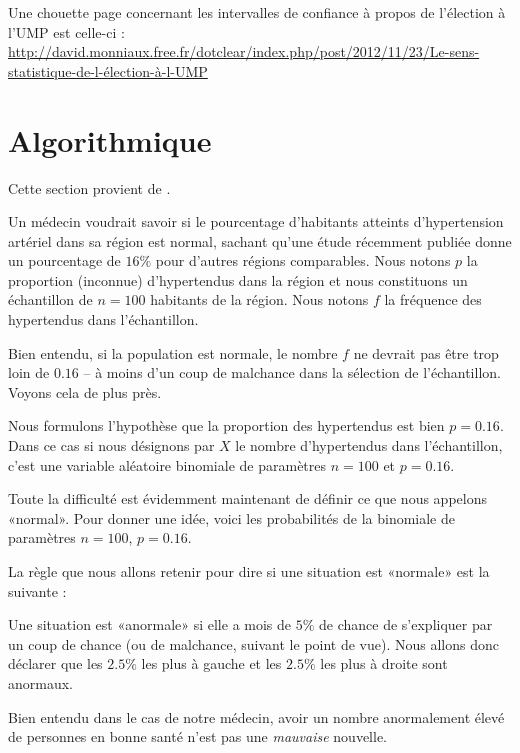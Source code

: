 Une chouette page concernant les intervalles de confiance à propos de l'élection à l'UMP est celle-ci :\\
\url{http://david.monniaux.free.fr/dotclear/index.php/post/2012/11/23/Le-sens-statistique-de-l-élection-à-l-UMP}

\section{Algorithmique}

Cette section provient de \cite{JqcbOc}.

Un médecin voudrait savoir si le pourcentage d'habitants atteints d'hypertension artériel dans sa région est normal, sachant qu'une étude récemment publiée donne un pourcentage de \( 16\%\) pour d'autres régions comparables. Nous notons \( p\) la proportion (inconnue) d'hypertendus dans la région et nous constituons un échantillon de \( n=100\) habitants de la région. Nous notons \( f\) la fréquence des hypertendus dans l'échantillon.

Bien entendu, si la population est normale, le nombre \( f\) ne devrait pas être trop loin de \( 0.16\) -- à moins d'un coup de malchance dans la sélection de l'échantillon. Voyons cela de plus près.

Nous formulons l'hypothèse que la proportion des hypertendus est bien \( p=0.16\). Dans ce cas si nous désignons par \( X\) le nombre d'hypertendus dans l'échantillon, c'est une variable aléatoire binomiale de paramètres \( n=100\) et \( p=0.16\).

Toute la difficulté est évidemment maintenant de définir ce que nous appelons «normal». Pour donner une idée, voici les probabilités de la binomiale de paramètres \( n=100\), \( p=0.16\).

\begin{center}

\end{center}

La règle que nous allons retenir pour dire si une situation est «normale» est la suivante :
\begin{Aretenir}
    Une situation est «anormale» si elle a mois de \( 5\%\) de chance de s'expliquer par un coup de chance (ou de malchance, suivant le point de vue). Nous allons donc déclarer que les \( 2.5\%\) les plus à gauche et les \( 2.5\%\) les plus à droite sont anormaux.
\end{Aretenir}
Bien entendu dans le cas de notre médecin, avoir un nombre anormalement élevé de personnes en bonne santé n'est pas une \emph{mauvaise} nouvelle. 

